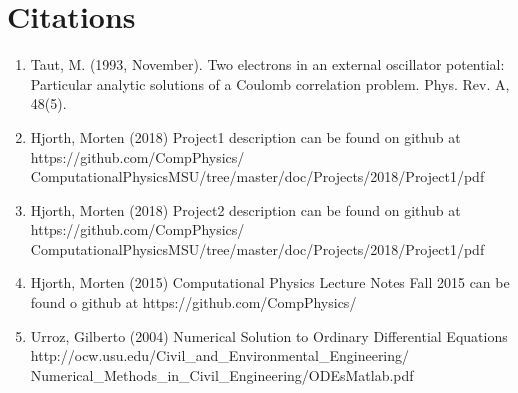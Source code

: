 \documentclass[%
 reprint,
 amsmath,amssymb,
 aps,
]{revtex4-1}
\begin{document}
\section{Citations}
\begin{enumerate}
\item Taut, M. (1993, November). Two electrons in an external oscillator potential: Particular analytic solutions of a Coulomb correlation problem. Phys. Rev. A, 48(5). 
\item Hjorth, Morten (2018) Project1 description can be found on github at https://github.com/CompPhysics/
ComputationalPhysicsMSU/tree/master/doc/Projects/2018/Project1/pdf
\item Hjorth, Morten (2018) Project2 description can be found on github at https://github.com/CompPhysics/
ComputationalPhysicsMSU/tree/master/doc/Projects/2018/Project1/pdf
\item Hjorth, Morten (2015) Computational Physics Lecture Notes Fall 2015 can be found o github at https://github.com/CompPhysics/
\item Urroz, Gilberto (2004) Numerical Solution to Ordinary Differential Equations http://ocw.usu.edu/Civil\_and\_Environmental\_Engineering/
Numerical\_Methods\_in\_Civil\_Engineering/ODEsMatlab.pdf
\end{enumerate}
\end{document}
